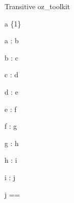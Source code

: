 \begin{zsection}
  \SECTION Transitive \parents oz\_toolkit
\end{zsection}

\begin{axdef}
\where
  a \in \{1\}
\end{axdef}

\begin{axdef}
  a : b
\end{axdef}

\begin{axdef}
  b : c
\end{axdef}

\begin{axdef}
  c : d
\end{axdef}

\begin{axdef}
  d : e
\end{axdef}

\begin{axdef}
  e : f
\end{axdef}

\begin{axdef}
  f : g
\end{axdef}

\begin{axdef}
  g : h
\end{axdef}

\begin{axdef}
  h : i
\end{axdef}

\begin{axdef}
  i : j
\end{axdef}

\begin{zed}
  j == \power\power\power\power\power\power\power\power\nat
\end{zed}

